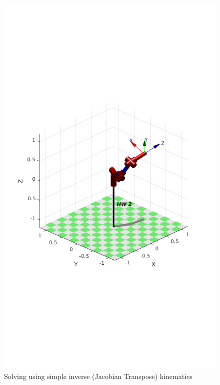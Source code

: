 \documentclass{../homework}
\begin{document}
\begin{solution}
  \begin{figure}[H]
    \centering
    \includegraphics[scale=.3]{3-1inv_simp.png}
    \caption{Solving using simple inverse (Jacobian Transpose) kinematics}
  \end{figure}
  

\end{solution}
\end{document}
